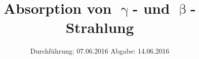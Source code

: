 
\subject{704}
\title{Absorption von \texorpdfstring{$\upgamma$}{γ}- und \texorpdfstring{$\upbeta$}{β}-Strahlung}
\date{
  Durchführung: 07.06.2016
  \hspace{3em}
  Abgabe: 14.06.2016
}



\maketitle
\newpage
\mbox{}
\newpage
\thispagestyle{empty}
\tableofcontents
\newpage






\nocite{numpy}
\nocite{matplotlib}
\nocite{uncertainties}
\printbibliography



